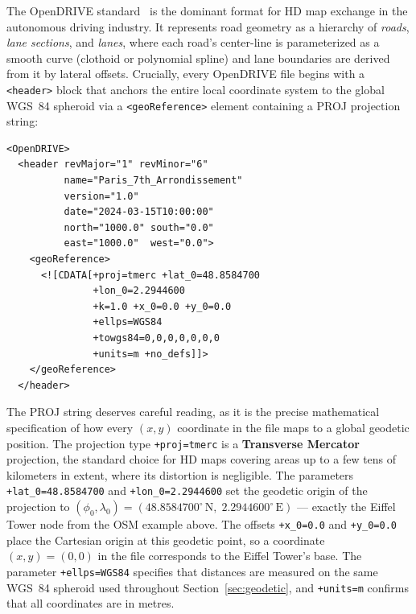 \documentclass{book}
\begin{document}
The OpenDRIVE standard~\cite{dupuis2010opendrive} is the dominant
format for HD map exchange in the autonomous driving industry.  It
represents road geometry as a hierarchy of \emph{roads},
\emph{lane sections}, and \emph{lanes}, where each road's
center-line is parameterized as a smooth curve (clothoid or
polynomial spline) and lane boundaries are derived from it by lateral
offsets.  Crucially, every OpenDRIVE file begins with a
\texttt{<header>} block that anchors the entire local coordinate
system to the global WGS~84 spheroid via a \texttt{<geoReference>}
element containing a PROJ projection string:

\begin{verbatim}
<OpenDRIVE>
  <header revMajor="1" revMinor="6"
          name="Paris_7th_Arrondissement"
          version="1.0"
          date="2024-03-15T10:00:00"
          north="1000.0" south="0.0"
          east="1000.0"  west="0.0">
    <geoReference>
      <![CDATA[+proj=tmerc +lat_0=48.8584700
               +lon_0=2.2944600
               +k=1.0 +x_0=0.0 +y_0=0.0
               +ellps=WGS84
               +towgs84=0,0,0,0,0,0,0
               +units=m +no_defs]]>
    </geoReference>
  </header>
\end{verbatim}

\noindent The PROJ string deserves careful reading, as it is the
precise mathematical specification of how every $(x, y)$ coordinate
in the file maps to a global geodetic position.  The projection type
\texttt{+proj=tmerc} is a \textbf{Transverse Mercator} projection,
the standard choice for HD maps covering areas up to a few tens of
kilometers in extent, where its distortion is negligible.  The
parameters \texttt{+lat\_0=48.8584700} and
\texttt{+lon\_0=2.2944600} set the geodetic origin of the projection
to $(\phi_0, \lambda_0) = (48.8584700^\circ\,\text{N},\;
2.2944600^\circ\,\text{E})$ --- exactly the Eiffel Tower node from
the OSM example above.  The offsets \texttt{+x\_0=0.0} and
\texttt{+y\_0=0.0} place the Cartesian origin at this geodetic point,
so a coordinate $(x, y) = (0, 0)$ in the file corresponds to the
Eiffel Tower's base.  The parameter \texttt{+ellps=WGS84} specifies
that distances are measured on the same WGS~84 spheroid used
throughout Section~\ref{sec:geodetic}, and \texttt{+units=m}
confirms that all coordinates are in metres.
\end{document}

